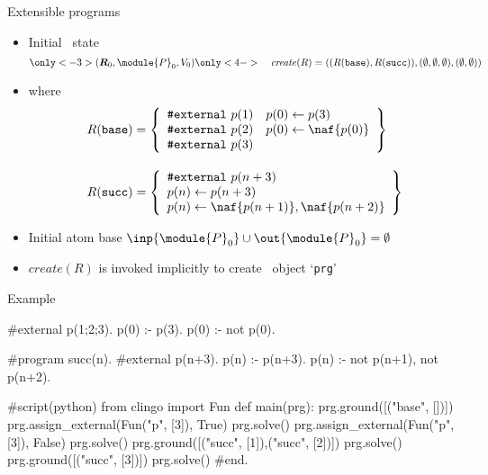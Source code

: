 \begin{frame}{Extensible programs}
  \begin{itemize}
  \item Initial \clingo\ state
    \[
    \only<-3>{(\boldsymbol{\RRG}_0,\module{P}_0,V_0 )}\only<4->{\hspace{10pt}\mathit{create}(R)}
    =
    (
    (\RRG(\mathtt{base}),\RRG(\mathtt{succ})),(\emptyset,\emptyset,\emptyset),(\emptyset,\emptyset)
    )
    \]
  \item[] where 
    \begin{align*}
      \RRG(\mathtt{base})
      &=
      \left\{
        \begin{array}{ll}
          \texttt{\#external}~p(1) & p(0)\leftarrow p(3)      \\
          \texttt{\#external}~p(2) & p(0)\leftarrow \naf{p(0)}\\
          \texttt{\#external}~p(3) &\\
        \end{array}
      \right\}
      \\[10pt]
      \RRG(\mathtt{succ})
      &=
      \left\{
        \begin{array}{l}
          \texttt{\#external}~p(n+3)\\
          p(n)\leftarrow p(n+3)\\
          p(n)\leftarrow \naf{p(n+1)},\naf{p(n+2)}
        \end{array}
      \right\}
    \end{align*}
  \item<2-> Initial atom base
    \(
    \inp{\module{P}_0}\cup\out{\module{P}_0}=\emptyset
    \)
  \item <only@5>  $\mathit{create}(R)$ is invoked implicitly to create \clingo\ object `\texttt{prg}'
  \end{itemize}
\end{frame}
\begin{frame}[fragile]{Example}
\scriptsize\vspace{-10pt}%
\begin{semiverbatim}
   #external p(1;2;3).
   p(0) :- p(3).
   p(0) :- not p(0).

   #program succ(n).
   #external p(n+3).
   p(n) :- p(n+3).
   p(n) :- not p(n+1), not p(n+2).

   #script(python)
   from clingo import Fun
   def main(prg):
     \alert<2>{prg.ground([("base", [])])}
       prg.assign_external(Fun("p", [3]), True)
       prg.solve()
       prg.assign_external(Fun("p", [3]), False)
       prg.solve()
       prg.ground([("succ", [1]),("succ", [2])])
       prg.solve()
       prg.ground([("succ", [3])])
       prg.solve()
   #end.
\end{semiverbatim}
\end{frame}
